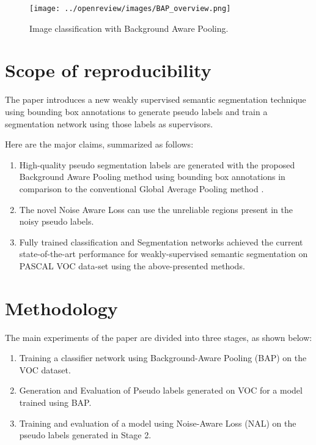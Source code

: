 \begin{figure}[h!]
\begin{center}
\texttt{[image: ../openreview/images/BAP\_overview.png]}
\caption{\label{fig:bap_overview}{Image classification with Background Aware Pooling.}}
\end{center}
\end{figure}

\section{Scope of reproducibility}
\label{sec:claims}

The paper introduces a new weakly supervised semantic segmentation technique using bounding box annotations to generate pseudo labels and train a segmentation network using those labels as supervisors. 

Here are the major claims, summarized as follows: 

\begin{enumerate}
    \item High-quality pseudo segmentation labels are generated with the proposed Background Aware Pooling method using bounding box annotations in comparison to the conventional Global Average Pooling method \cite{lin2013network, zhou2016learning}. 
    \item The novel Noise Aware Loss can use the unreliable regions present in the noisy pseudo labels. 
    \item Fully trained classification and Segmentation networks achieved the current state-of-the-art performance for weakly-supervised semantic segmentation on PASCAL VOC data-set using the above-presented methods. 
\end{enumerate}

\section{Methodology}
The main experiments of the paper are divided into three stages, as shown below:
\begin{enumerate}
    \item Training a classifier network using Background-Aware Pooling (BAP) on the VOC dataset.
    \item Generation and Evaluation of Pseudo labels generated on VOC for a model trained using BAP.
    \item Training and evaluation of a model using Noise-Aware Loss (NAL) on the pseudo labels generated in Stage 2.
\end{enumerate}

